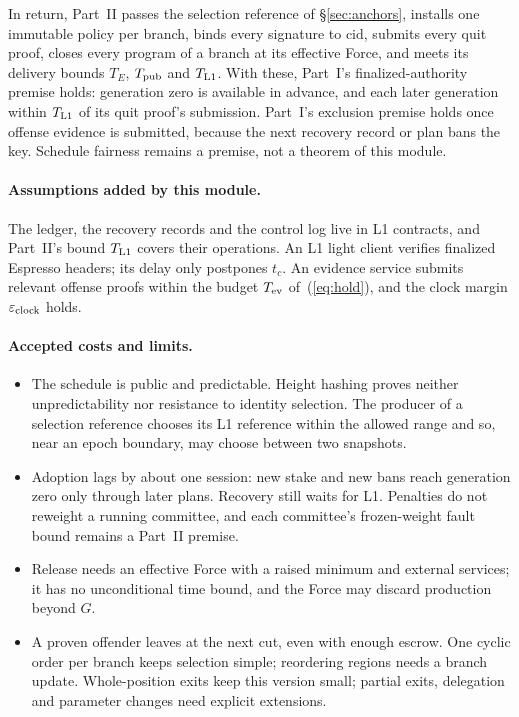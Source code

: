 \documentclass[11pt,a4paper]{article}
\newcommand{\cid}{\mathrm{cid}}
\begin{document}
In return, Part~II passes the selection reference of \S\ref{sec:anchors},
installs one immutable policy per branch, binds every signature to
$\cid$, submits every quit proof, closes every program of a branch at its
effective Force, and meets its delivery bounds $T_E$, $T_{\rm pub}$ and
$T_{\rm L1}$. With these, Part~I's finalized-authority premise holds:
generation zero is available in advance, and each later generation within
$T_{\rm L1}$ of its quit proof's submission. Part~I's exclusion premise
holds once offense evidence is submitted, because the next recovery record
or plan bans the key. Schedule fairness remains a premise, not a theorem
of this module.

\paragraph{Assumptions added by this module.}
The ledger, the recovery records and the control log live in L1
contracts, and Part~II's bound $T_{\rm L1}$ covers their operations. An
L1 light client verifies finalized Espresso headers; its delay only
postpones $t_c$. An evidence service submits relevant offense proofs
within the budget $T_{\rm ev}$ of~(\ref{eq:hold}), and the clock margin
$\varepsilon_{\rm clock}$ holds.

\paragraph{Accepted costs and limits.}
\begin{itemize}[itemsep=3pt]
\item The schedule is public and predictable. Height hashing proves
neither unpredictability nor resistance to identity selection. The
producer of a selection reference chooses its L1 reference within the
allowed range and so, near an epoch boundary, may choose between two
snapshots.
\item Adoption lags by about one session: new stake and new bans reach
generation zero only through later plans. Recovery still waits for L1.
Penalties do not reweight a running committee, and each committee's
frozen-weight fault bound remains a Part~II premise.
\item Release needs an effective Force with a raised minimum and external
services; it has no unconditional time bound, and the Force may discard
production beyond $G$.
\item A proven offender leaves at the next cut, even with enough escrow.
One cyclic order per branch keeps selection simple; reordering regions
needs a branch update. Whole-position exits keep this version small;
partial exits, delegation and parameter changes need explicit extensions.
\end{itemize}
\end{document}
